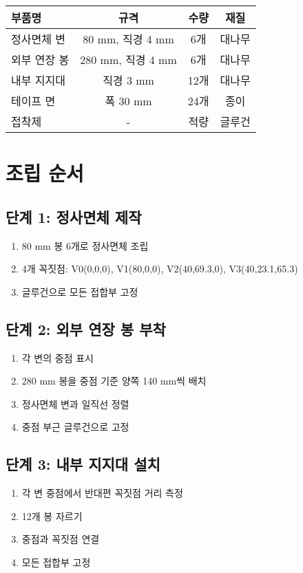 \documentclass[a4paper,12pt]{article}
\begin{document}
\begin{CJK}{UTF8}{mj}
\begin{center}
\begin{tabular}{lccc}
\toprule
\textbf{부품명} & \textbf{규격} & \textbf{수량} & \textbf{재질} \\
\midrule
정사면체 변 & 80 mm, 직경 4 mm & 6개 & 대나무 \\
외부 연장 봉 & 280 mm, 직경 4 mm & 6개 & 대나무 \\
내부 지지대 & 직경 3 mm & 12개 & 대나무 \\
테이프 면 & 폭 30 mm & 24개 & 종이 \\
접착제 & - & 적량 & 글루건 \\
\bottomrule
\end{tabular}
\end{center}

\section{조립 순서}

\subsection{단계 1: 정사면체 제작}
\begin{enumerate}
    \item 80 mm 봉 6개로 정사면체 조립
    \item 4개 꼭짓점: V0(0,0,0), V1(80,0,0), V2(40,69.3,0), V3(40,23.1,65.3)
    \item 글루건으로 모든 접합부 고정
\end{enumerate}

\subsection{단계 2: 외부 연장 봉 부착}
\begin{enumerate}
    \item 각 변의 중점 표시
    \item 280 mm 봉을 중점 기준 양쪽 140 mm씩 배치
    \item 정사면체 변과 일직선 정렬
    \item 중점 부근 글루건으로 고정
\end{enumerate}

\subsection{단계 3: 내부 지지대 설치}
\begin{enumerate}
    \item 각 변 중점에서 반대편 꼭짓점 거리 측정
    \item 12개 봉 자르기
    \item 중점과 꼭짓점 연결
    \item 모든 접합부 고정
\end{enumerate}


\end{CJK}
\end{document}
